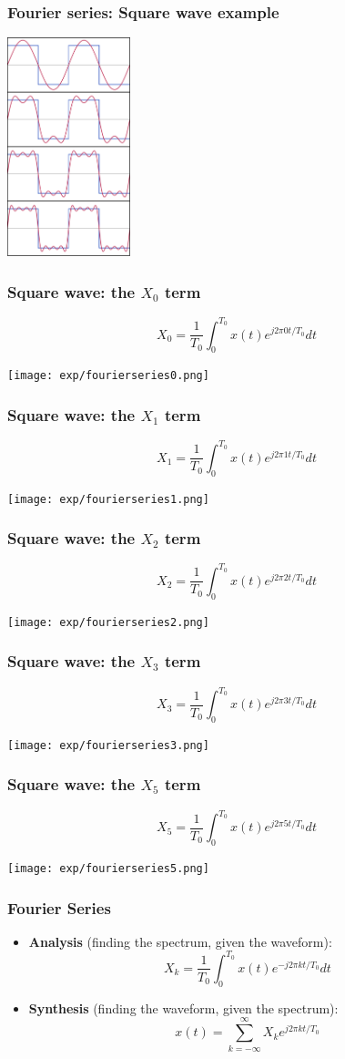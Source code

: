 \documentclass{beamer}
\begin{document}
\begin{frame}
  \frametitle{Fourier series: Square wave example}
  \centerline{\includegraphics[height=2.5in]{../lec04/squarewave.png}}
\end{frame}

\begin{frame}
  \frametitle{Square wave: the $X_0$ term}
    \[
    X_0 = \frac{1}{T_0}\int_0^{T_0} x(t)e^{j2\pi 0 t/T_0}dt
    \]
  \centerline{\texttt{[image: exp/fourierseries0.png]}}
\end{frame}

\begin{frame}
  \frametitle{Square wave: the $X_1$ term}
    \[
    X_1 = \frac{1}{T_0}\int_0^{T_0} x(t)e^{j2\pi 1 t/T_0}dt
    \]
  \centerline{\texttt{[image: exp/fourierseries1.png]}}
\end{frame}

\begin{frame}
  \frametitle{Square wave: the $X_2$ term}
    \[
    X_2 = \frac{1}{T_0}\int_0^{T_0} x(t)e^{j2\pi 2 t/T_0}dt
    \]
  \centerline{\texttt{[image: exp/fourierseries2.png]}}
\end{frame}

\begin{frame}
  \frametitle{Square wave: the $X_3$ term}
    \[
    X_3 = \frac{1}{T_0}\int_0^{T_0} x(t)e^{j2\pi 3 t/T_0}dt
    \]
  \centerline{\texttt{[image: exp/fourierseries3.png]}}
\end{frame}

\begin{frame}
  \frametitle{Square wave: the $X_5$ term}
    \[
    X_5 = \frac{1}{T_0}\int_0^{T_0} x(t)e^{j2\pi 5 t/T_0}dt
    \]
  \centerline{\texttt{[image: exp/fourierseries5.png]}}
\end{frame}

\begin{frame}
  \frametitle{Fourier Series}

  \begin{itemize}
  \item {\bf Analysis}  (finding the spectrum, given the waveform):
    \[
    X_k = \frac{1}{T_0}\int_0^{T_0} x(t)e^{-j2\pi kt/T_0}dt
    \]
  \item {\bf Synthesis} (finding the waveform, given the spectrum):
    \[
    x(t) = \sum_{k=-\infty}^\infty X_k e^{j2\pi kt/T_0}
    \]
  \end{itemize}
  
\end{frame}  
\end{document}

